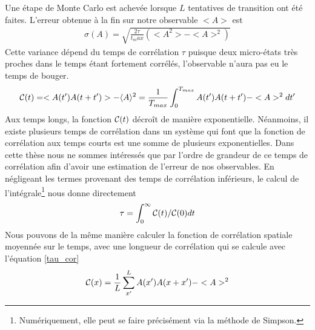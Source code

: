 Une étape de Monte Carlo est achevée lorsque $L$ tentatives de transition ont été faites. L'erreur obtenue à la fin sur notre observable $<A>$ est 
\begin{align}
	\sigma(A) = \sqrt{\frac{2 \tau}{t_max} (<A^2>-<A>^2)}
\end{align}
Cette variance dépend du temps de corrélation $\tau$ puisque deux micro-états très proches dans le temps étant fortement corrélés, l'observable n'aura pas eu le temps de bouger. 
\begin{align}
\mathcal{C}(t) = <A(t')A(t+t')>-\langle A \rangle^2 = \frac{1}{T_{max}}\int_0^{T_{max}}A(t')A(t+t')-<A>^2 dt'
\end{align}
Aux temps longs, la fonction $\mathcal{C}(t)$ décroît de manière exponentielle. Néanmoins, il existe plusieurs temps de corrélation dans un système qui font que la fonction de corrélation aux temps courts est une somme de plusieurs exponentielles\cite{wanslebenlandau1991_3disingmodel}. Dans cette thèse nous ne sommes intéressés que par l'ordre de grandeur de ce temps de corrélation afin d'avoir une estimation de l'erreur de nos observables. En négligeant les termes provenant des temps de corrélation inférieurs, le calcul de l'intégrale\footnote{Numériquement, elle peut se faire précisément via la méthode de Simpson.}  nous donne directement
\begin{align}
	\tau = \int_0^{\infty} \mathcal{C}(t)/\mathcal{C}(0) dt
	\label{tau_cor}
\end{align}
Nous pouvons de la même manière calculer la fonction de corrélation spatiale moyennée sur le temps, avec une longueur de corrélation qui se calcule avec l'équation \ref{tau_cor}
\begin{align}
\mathcal{C}(x) = \frac{1}{L} \sum_{x'}^L A(x')A(x+x')-<A>^2 
\end{align}


